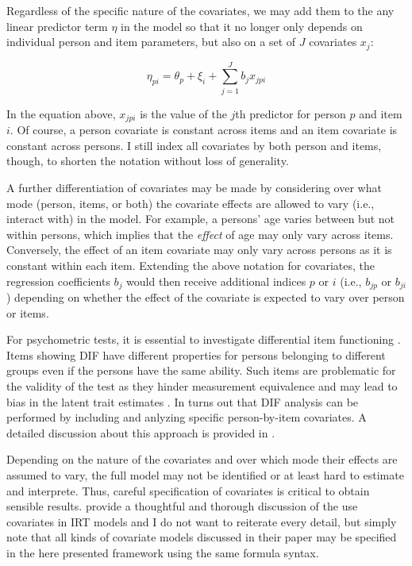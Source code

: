 \documentclass[jss]{jss}
\begin{document}
Regardless of the specific nature of the covariates, we may add them to
the any linear predictor term \(\eta\) in the model so that it no longer
only depends on individual person and item parameters, but also on a set
of \(J\) covariates \(x_j\):

\[
\eta_{pi} = \theta_p + \xi_i + \sum_{j=1}^J b_j x_{jpi}
\]

In the equation above, \(x_{jpi}\) is the value of the \(j\)th predictor
for person \(p\) and item \(i\). Of course, a person covariate is
constant across items and an item covariate is constant across persons.
I still index all covariates by both person and items, though, to
shorten the notation without loss of generality.

A further differentiation of covariates may be made by considering over
what mode (person, items, or both) the covariate effects are allowed to
vary (i.e., interact with) in the model. For example, a persons' age
varies between but not within persons, which implies that the
\emph{effect} of age may only vary across items. Conversely, the effect
of an item covariate may only vary across persons as it is constant
within each item. Extending the above notation for covariates, the
regression coefficients \(b_j\) would then receive additional indices
\(p\) or \(i\) (i.e., \(b_{jp}\) or \(b_{ji}\)) depending on whether the
effect of the covariate is expected to vary over person or items.

For psychometric tests, it is essential to investigate differential item
functioning \citep[DIF;][]{holland2012}. Items showing DIF have
different properties for persons belonging to different groups even if
the persons have the same ability. Such items are problematic for the
validity of the test as they hinder measurement equivalence and may lead
to bias in the latent trait estimates \citep{millsap1993, holland2012}.
In turns out that DIF analysis can be performed by including and
anlyzing specific person-by-item covariates. A detailed discussion about
this approach is provided in \citet{deboeck2011}.

Depending on the nature of the covariates and over which mode their
effects are assumed to vary, the full model may not be identified or at
least hard to estimate and interprete. Thus, careful specification of
covariates is critical to obtain sensible results. \citet{deboeck2011}
provide a thoughtful and thorough discussion of the use covariates in
IRT models and I do not want to reiterate every detail, but simply note
that all kinds of covariate models discussed in their paper may be
specified in the here presented framework using the same formula syntax.
\end{document}
